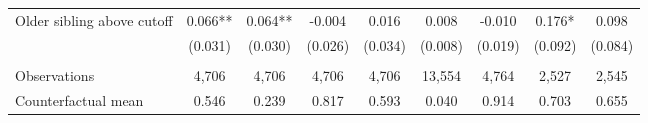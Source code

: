 {{\begin{tabular}{lcccccccc}
Older sibling above cutoff&       0.066** &       0.064** &      -0.004   &       0.016   &       0.008   &      -0.010   &       0.176*  &       0.098   \\
                    &     (0.031)   &     (0.030)   &     (0.026)   &     (0.034)   &     (0.008)   &     (0.019)   &     (0.092)   &     (0.084)   \\
                    &               &               &               &               &               &               &               &               \\
Observations        &       4,706   &       4,706   &       4,706   &       4,706   &      13,554   &       4,764   &       2,527   &       2,545   \\
Counterfactual mean &       0.546   &       0.239   &       0.817   &       0.593   &       0.040   &       0.914   &       0.703   &       0.655   \\
 

\bottomrule
\end{tabular}
}
}
